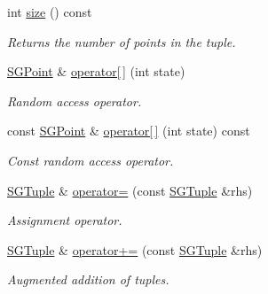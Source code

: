 \begin{DoxyCompactItemize}
\mbox{\label{classSGTuple_a3f4706837a5389733d8179d71257bcf4}} 
int \hyperlink{classSGTuple_a3f4706837a5389733d8179d71257bcf4}{size} () const
\begin{DoxyCompactList}\small\item\em Returns the number of points in the tuple. \end{DoxyCompactList}\item 
\mbox{\label{classSGTuple_a3dc5760a50667dd79be207bfe304d04d}} 
\hyperlink{classSGPoint}{S\+G\+Point} \& \hyperlink{classSGTuple_a3dc5760a50667dd79be207bfe304d04d}{operator\mbox{[}$\,$\mbox{]}} (int state)
\begin{DoxyCompactList}\small\item\em Random access operator. \end{DoxyCompactList}\item 
\mbox{\label{classSGTuple_acbf5413d481996d56c9fad235d54e5a8}} 
const \hyperlink{classSGPoint}{S\+G\+Point} \& \hyperlink{classSGTuple_acbf5413d481996d56c9fad235d54e5a8}{operator\mbox{[}$\,$\mbox{]}} (int state) const
\begin{DoxyCompactList}\small\item\em Const random access operator. \end{DoxyCompactList}\item 
\mbox{\label{classSGTuple_a1274463fbd40d837c0167252555156e0}} 
\hyperlink{classSGTuple}{S\+G\+Tuple} \& \hyperlink{classSGTuple_a1274463fbd40d837c0167252555156e0}{operator=} (const \hyperlink{classSGTuple}{S\+G\+Tuple} \&rhs)
\begin{DoxyCompactList}\small\item\em Assignment operator. \end{DoxyCompactList}\item 
\mbox{\label{classSGTuple_acf8c7d73d8f2704979ca44b0c755ecc7}} 
\hyperlink{classSGTuple}{S\+G\+Tuple} \& \hyperlink{classSGTuple_acf8c7d73d8f2704979ca44b0c755ecc7}{operator+=} (const \hyperlink{classSGTuple}{S\+G\+Tuple} \&rhs)
\begin{DoxyCompactList}\small\item\em Augmented addition of tuples. \end{DoxyCompactList}\item 
\mbox{\label{classSGTuple_ae3c5e1bb4faf5fb652cdb8440133d2de}} 

\end{DoxyCompactItemize}
